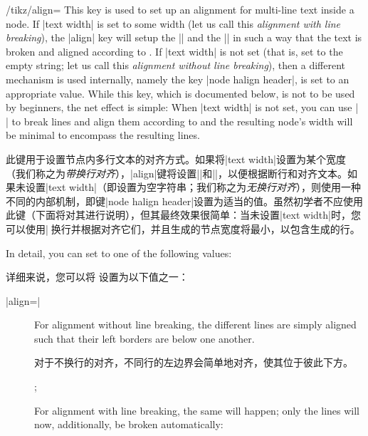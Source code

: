 \begin{key}{/tikz/align=}
    This key is used to set up an alignment for multi-line text inside a node.
    If |text width| is set to some width (let us call this \emph{alignment with
    line breaking}), the |align| key will setup the |\leftskip| and the
    |\rightskip| in such a way that the text is broken and aligned according to
    . If |text width| is not set (that is, set to the
    empty string; let us call this \emph{alignment without line breaking}),
    then a different mechanism is used internally, namely the key
    |node halign header|, is set to an appropriate value. While this key, which
    is documented below, is not to be used by beginners, the net effect is
    simple: When |text width| is not set, you can use |\\| to break lines and
    align them according to  and the resulting node's
    width will be minimal to encompass the resulting lines.

    此键用于设置节点内多行文本的对齐方式。如果将|text width|设置为某个宽度（我们称之为\emph{带换行对齐}），|align|键将设置|\leftskip|和|\rightskip|，以便根据断行和对齐文本。如果未设置|text width|（即设置为空字符串；我们称之为\emph{无换行对齐}），则使用一种不同的内部机制，即键|node halign header|设置为适当的值。虽然初学者不应使用此键（下面将对其进行说明），但其最终效果很简单：当未设置|text width|时，您可以使用|\|来换行并根据对齐它们，并且生成的节点宽度将最小，以包含生成的行。



    In detail, you can set  to one of the following values:
    
    详细来说，您可以将  设置为以下值之一：


    \begin{description}
        \item[|align=|] For alignment without line breaking,
            the different lines are simply aligned such that their left borders
            are below one another.

            对于不换行的对齐，不同行的左边界会简单地对齐，使其位于彼此下方。
\begin{codeexample}[]
\tikz {};
\end{codeexample}
            For alignment with line breaking, the same will happen; only the
            lines will now, additionally, be broken automatically:


\end{description}
\end{key}
